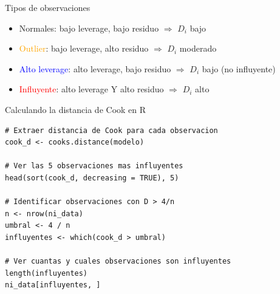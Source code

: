 \documentclass[aspectratio=169, 11pt]{beamer}
\begin{document}
\begin{frame}{Tipos de observaciones}
\begin{center}
\end{center}

\vspace{0.2cm}
\small
\begin{itemize}
\item \textcolor{javerianalight}{Normales}: bajo leverage, bajo residuo $\Rightarrow$ $D_i$ bajo
\item \textcolor{orange}{Outlier}: bajo leverage, alto residuo $\Rightarrow$ $D_i$ moderado
\item \textcolor{blue}{Alto leverage}: alto leverage, bajo residuo $\Rightarrow$ $D_i$ bajo (no influyente)
\item \textcolor{red}{Influyente}: alto leverage Y alto residuo $\Rightarrow$ $D_i$ alto
\end{itemize}
\end{frame}

\begin{frame}[fragile]{Calculando la distancia de Cook en R}
\begin{lstlisting}
# Extraer distancia de Cook para cada observacion
cook_d <- cooks.distance(modelo)

# Ver las 5 observaciones mas influyentes
head(sort(cook_d, decreasing = TRUE), 5)

# Identificar observaciones con D > 4/n
n <- nrow(ni_data)
umbral <- 4 / n
influyentes <- which(cook_d > umbral)

# Ver cuantas y cuales observaciones son influyentes
length(influyentes)
ni_data[influyentes, ]
\end{lstlisting}
\end{frame}
\end{document}
